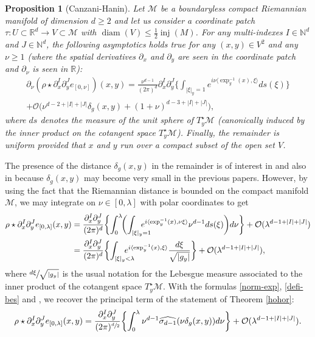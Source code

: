 \documentclass[JEP,XML,SOM,Unicode,NoEqCountersInSection,published]{cedram}
\theoremstyle{theorem}
\newtheorem{prop}[theo]{Proposition}
\theoremstyle{definition}
\newcommand\R{\mathbb{R}}
\newcommand\N{\mathbb{N}}
\begin{document}
\begin{prop}[Canzani-Hanin]\label{can-han} Let $\mathcal{M}$ be a boundaryless compact Riemannian manifold of dimension $d\geq 2$ and let us consider a coordinate patch $\tau:U\subset\R^d\to V\subset\mathcal{M}$ with $\operatorname{diam}(V)\leq \frac{1}{2}\operatorname{inj}(M)$.
For any multi-indexes $I\in \N^{d}$ and $J\in \N^d$, the following asymptotics holds true for any $(x,y)\in V^2$ and any $\nu\geq 1$ (where the spatial derivatives $\partial_x$ and $\partial_y$ are seen in the coordinate patch and $\partial_\nu$ is seen in $\R$):
\begin{multline*}
\partial_\nu (\rho \star \partial_x^I \partial_y^J e_{[0,\nu]})(x,y)=\frac{\nu^{d-1}}{(2\pi)^d} \partial_x^{I} \partial_y^{J} \biggl\{\int_{|\xi|_{y}=1} e^{i \nu\langle \exp_y^{-1}(x),\xi\rangle }ds(\xi)\biggr\}\\
+\mathcal{O}\bigl(\nu^{d-2+|I|+|J|}\delta_g(x,y)+(1+\nu)^{d-3+|I|+|J|} \bigr),
\end{multline*}
where $ds$ denotes the measure of the unit sphere of
$T_y^\star \mathcal{M}$ (canonically induced by the inner product on the cotangent space $T_y^\star\mathcal{M}$). Finally, the remainder is uniform provided that $x$ and $y$ run over a compact subset of the open set $V$.
\end{prop}
The presence of the distance $\delta_g(x,y)$ in the remainder is of interest in \cite{canzani2017c} and also in \cite[Prop.\,10]{canzani2015scaling} because $\delta_g(x,y)$ may become very small in the previous papers. However, by using the fact that the Riemannian distance is bounded on the compact manifold $\mathcal{M}$, we may integrate on $\nu\in [0,\lambda]$ with polar coordinates to get
\begin{align*}
\rho\star \partial_x^I \partial_y^J e_{[0,\lambda]}(x,y)&=\frac{\partial_x^I \partial_y^J}{(2\pi)^d}\biggl\{ \int_{0}^\lambda\! \biggl(\int_{|\xi|_{y}=1}\hspace*{-5mm} e^{i\langle \exp_y^{-1}(x),\nu \xi\rangle} \nu^{d-1} ds(\xi)\biggr) d\nu \biggr\}+\mathcal{O}(\lambda^{d-1+|I|+|J|}) \\
&=\frac{\partial_x^I \partial_y^J}{(2\pi)^d}\biggl\{ \int_{|\xi|_{y}<\lambda}\hspace*{-5mm} e^{i\langle \exp_y^{-1}(x),\xi\rangle} \frac{ d\xi }{\sqrt{|g_y|}} \biggr\}+\mathcal{O}(\lambda^{d-1+|I|+|J|}),
\end{align*}
where $\sfrac{d\xi}{\sqrt{|g_y|}}$ is the usual notation for the Lebesgue measure associated to the inner product of the cotangent space $T_y^\star \mathcal{M}$. With the formulas \eqref{norm-exp}, \eqref{defi-bes} and \cite[lines (8--9)]{canzani2017c}, we recover the principal term of the statement of Theorem \ref{hohor}:
\begin{equation*}
\rho\star \partial_x^I \partial_y^J e_{[0,\lambda]}(x,y)
= \frac{\partial_x^{I}\partial_y^J}{(2\pi)^{\sfrac{d}{2}}}\biggl\{\int_{0}^{\lambda }\nu^{d-1} \widehat{\sigma_{d-1}}(\nu \delta_g(x,y))
d\nu\biggr\} +\mathcal{O}(\lambda^{d-1+|I|+|J|}).
\end{equation*}
\end{document}
